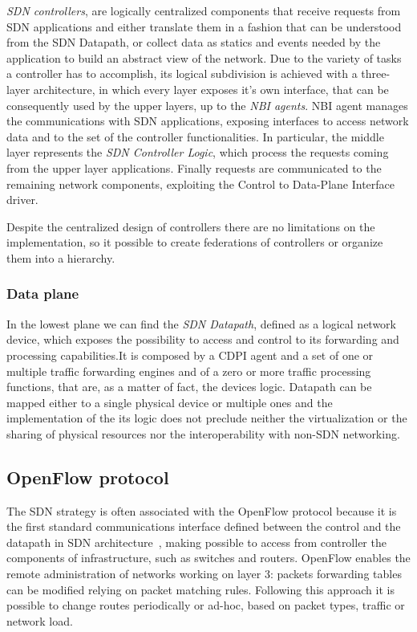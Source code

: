 \emph{SDN controllers}, are logically centralized components that
receive requests from SDN applications and either translate them 
in a fashion that can be understood from the SDN Datapath, or collect 
data as statics and events needed by the application to build an abstract view
of the network. 
Due to the variety of tasks a controller has to accomplish, its logical 
subdivision is achieved with a three-layer architecture, in which every layer 
exposes it's own interface, that can be consequently used by the upper 
layers, up to the \emph{NBI agents}.
NBI agent manages the communications with SDN applications, exposing interfaces
to access network data and to the set of the controller functionalities.
In particular, the middle layer represents the \emph{SDN Controller Logic},
which process the requests coming from the upper layer applications. Finally
requests are communicated to the remaining network components, exploiting the
Control to Data-Plane Interface driver.

Despite the centralized design of controllers there are no limitations on the
implementation, so it possible to create federations of controllers or organize
them into a hierarchy.

\subsubsection{Data plane}
In the lowest plane we can find the \emph{SDN Datapath}, defined as a logical
network device, which exposes the possibility to access and control to its
forwarding and processing capabilities.It is composed by a CDPI agent and a set
of one or  multiple traffic forwarding engines and of a zero or more traffic
processing functions, that are, as a matter of fact, the devices logic.
Datapath can be mapped either to a single physical device or multiple ones and
the implementation of the its logic does not preclude neither the
virtualization or the sharing of physical resources nor the interoperability
with non-SDN networking.

\subsection{OpenFlow protocol}
The SDN strategy is often associated with the OpenFlow protocol because it is
the first standard communications interface defined between the control and the
datapath in SDN architecture~\cite{fundation2013software}, making possible to
access from controller the components of infrastructure, such as switches and
routers. OpenFlow enables the remote administration of networks working on 
layer 3: packets forwarding tables can be modified relying on packet matching 
rules. Following this approach it is possible to change routes periodically or 
ad-hoc, based on packet types, traffic or network load.

